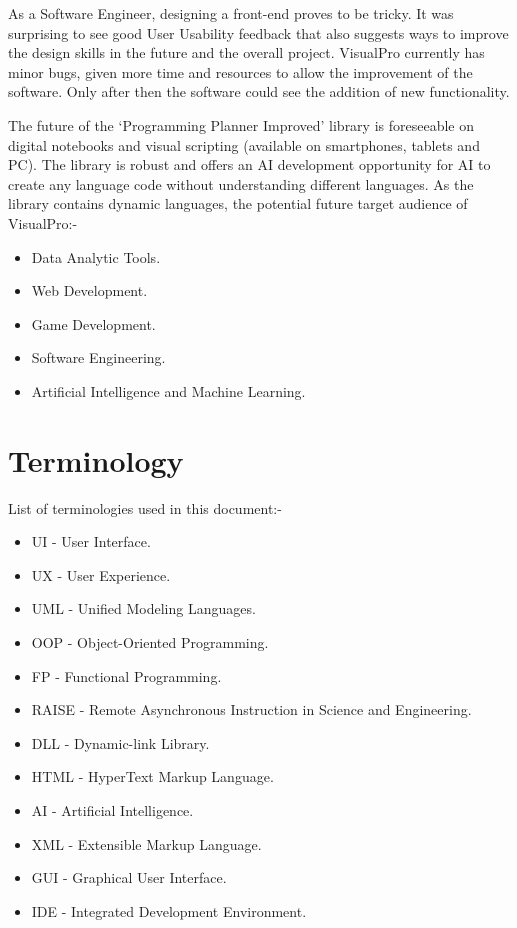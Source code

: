 \documentclass[12pt]{report} %
\begin{document}
		As a Software Engineer, designing a front-end proves to be tricky. It was surprising to see good User Usability feedback that also suggests ways to improve the design skills in the future and the overall project. VisualPro currently has minor bugs, given more time and resources to allow the improvement of the software. Only after then the software could see the addition of new functionality.

		The future of the `Programming Planner Improved' library is foreseeable on digital notebooks and visual scripting (available on smartphones, tablets and PC). The library is robust and offers an AI development opportunity for AI to create any language code without understanding different languages. As the library contains dynamic languages, the potential future target audience of VisualPro:-
		\begin{itemize}
			\item Data Analytic Tools.
			\item Web Development.
			\item Game Development.
			\item Software Engineering.
			\item Artificial Intelligence and Machine Learning.
		\end{itemize}
	
	\chapter{Terminology}
		List of terminologies used in this document:-
		\begin{itemize}
		\item UI - User Interface.
		\item UX - User Experience.
		\item UML - Unified Modeling Languages.
		\item OOP - Object-Oriented Programming.
		\item FP - Functional Programming.
		\item RAISE - Remote Asynchronous Instruction in Science and Engineering.
		\item DLL - Dynamic-link Library.
		\item HTML - HyperText Markup Language.
		\item AI - Artificial Intelligence.
		\item XML - Extensible Markup Language.
		\item GUI - Graphical User Interface.
		\item IDE - Integrated Development Environment.
		\end{itemize}
	

\clearpage
\nocite{*}
\small{
}


\end{document}
